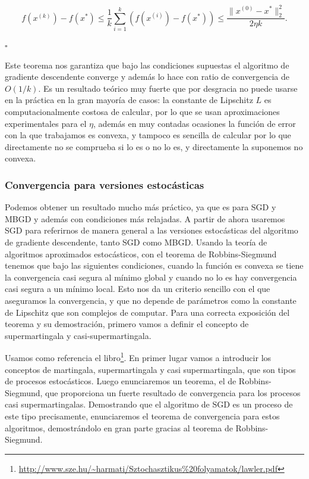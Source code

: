 $$f(x^{(k)}) - f(x^*) \leq \frac{1}{k} \sum ^k _{i=1} \left ( f(x^{(i)}) - f(x^*) \right ) \leq \frac{\|x^{(0)}-x^* \|^2_2}{2\eta k} .$$


\begin{flushright}
    $\square$
\end{flushright} 


Este teorema nos garantiza que bajo las condiciones supuestas el algoritmo de gradiente descendente converge y además lo hace con ratio de convergencia de $O(1/k)$. Es un resultado teórico muy fuerte que por desgracia no puede usarse en la práctica en la gran mayoría de casos: la constante de Lipschitz $L$ es computacionalmente costosa de calcular, por lo que se usan aproximaciones experimentales para el $\eta$, además en muy contadas ocasiones la función de error con la que trabajamos es convexa, y tampoco es sencilla de calcular por lo que directamente no se comprueba si lo es o no lo es, y directamente la suponemos no convexa. 



\subsubsection{Convergencia para versiones estocásticas}


Podemos obtener un resultado mucho más práctico, ya que es para SGD y MBGD y además con condiciones más relajadas. A partir de ahora usaremos SGD para referirnos de manera general a las versiones estocásticas del algoritmo de gradiente descendente, tanto SGD como MBGD. Usando la teoría de algoritmos aproximados estocásticos, con el teorema de Robbins-Siegmund tenemos que bajo las siguientes condiciones, cuando la función es convexa se tiene la convergencia casi segura al mínimo global y cuando no lo es hay convergencia casi segura a un mínimo local. Esto nos da un criterio sencillo con el que aseguramos la convergencia, y que no depende de parámetros como la constante de Lipschitz que son complejos de computar. Para una correcta exposición del teorema y su demostración, primero vamos a definir el concepto de supermartingala y casi-supermartingala. 

Usamos como referencia el libro\footnote{\url{http://www.sze.hu/~harmati/Sztochasztikus\%20folyamatok/lawler.pdf}}. En primer lugar vamos a introducir los conceptos de martingala, supermartingala y casi supermartingala, que son tipos de procesos estocásticos. Luego enunciaremos un teorema, el de Robbins-Siegmund, que proporciona un fuerte resultado de convergencia para los procesos casi supermartingalas. Demostrando que el algoritmo de SGD es un proceso de este tipo precisamente, enunciaremos el teorema de convergencia para estos algoritmos, demostrándolo en gran parte gracias al teorema de Robbins-Siegmund.





